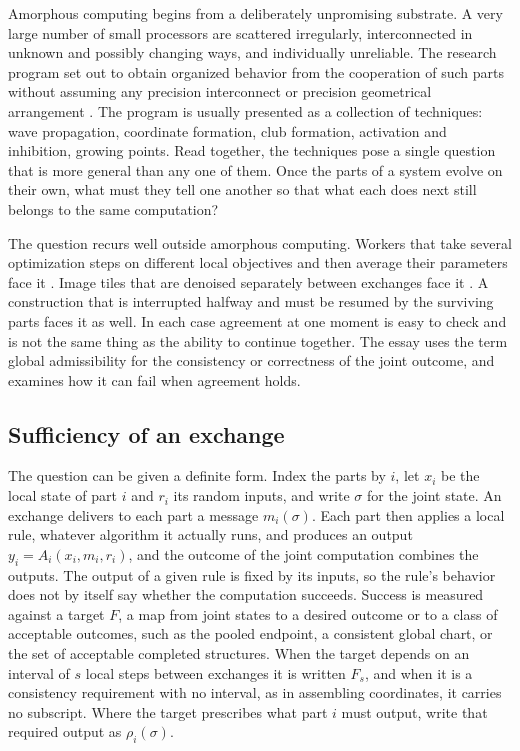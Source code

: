\documentclass[11pt]{article}
\theoremstyle{definition}
\theoremstyle{plain}
\theoremstyle{remark}
\begin{document}
Amorphous computing begins from a deliberately unpromising substrate. A very large number of small processors are scattered irregularly, interconnected in unknown and possibly changing ways, and individually unreliable. The research program set out to obtain organized behavior from the cooperation of such parts without assuming any precision interconnect or precision geometrical arrangement \cite{abelson2000,coore1997,darpa1998}. The program is usually presented as a collection of techniques: wave propagation, coordinate formation, club formation, activation and inhibition, growing points. Read together, the techniques pose a single question that is more general than any one of them. Once the parts of a system evolve on their own, what must they tell one another so that what each does next still belongs to the same computation?

The question recurs well outside amorphous computing. Workers that take several optimization steps on different local objectives and then average their parameters face it \cite{mcmahan2017,stich2019}. Image tiles that are denoised separately between exchanges face it \cite{bartal2023}. A construction that is interrupted halfway and must be resumed by the surviving parts faces it as well. In each case agreement at one moment is easy to check and is not the same thing as the ability to continue together. The essay uses the term global admissibility for the consistency or correctness of the joint outcome, and examines how it can fail when agreement holds.

\subsection*{Sufficiency of an exchange}

The question can be given a definite form. Index the parts by $i$, let $x_i$ be the local state of part $i$ and $r_i$ its random inputs, and write $\sigma$ for the joint state. An exchange delivers to each part a message $m_i(\sigma)$. Each part then applies a local rule, whatever algorithm it actually runs, and produces an output $y_i=A_i(x_i,m_i,r_i)$, and the outcome of the joint computation combines the outputs. The output of a given rule is fixed by its inputs, so the rule's behavior does not by itself say whether the computation succeeds. Success is measured against a target $F$, a map from joint states to a desired outcome or to a class of acceptable outcomes, such as the pooled endpoint, a consistent global chart, or the set of acceptable completed structures. When the target depends on an interval of $s$ local steps between exchanges it is written $F_s$, and when it is a consistency requirement with no interval, as in assembling coordinates, it carries no subscript. Where the target prescribes what part $i$ must output, write that required output as $\rho_i(\sigma)$.
\end{document}
